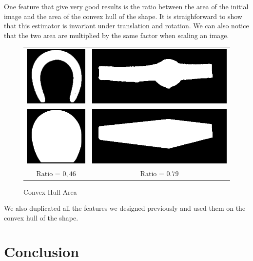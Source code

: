 \documentclass[a4paper, 11pt]{article}
\begin{document}
\medskip One feature that give very good results is the ratio between the area of the initial image and the area of the convex hull of the shape. It is straighforward to show that this estimator is invariant under translation and rotation. We can also notice that the two area are multiplied by the same factor when scaling an image.

\begin{figure}[h!]
\centering
\begin{tabular}{c@{~}c}
\includegraphics[height=3cm]{horseshoe.png} &
\includegraphics[height=3cm]{watch.png} \\
\includegraphics[height=3cm]{horseshoe-convex.png} &
\includegraphics[height=3cm]{watch-convex.png} \\
Ratio = $0,46$ & Ratio = $0.79$
\end{tabular}
\caption{Convex Hull Area}
\end{figure}

 We also duplicated all the features we designed previously and used them on the convex hull of the shape.

\newpage
\section{Conclusion}
\end{document}

